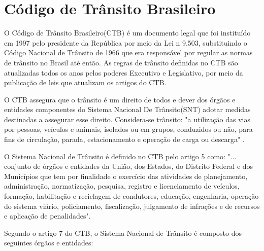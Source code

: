 \section{Código de Trânsito Brasileiro}


    O Código de Trânsito Brasileiro(CTB) é um documento legal que foi instituído em 1997 pelo presidente da República por meio da Lei n 9.503, substituindo o Código Nacional de Trânsito de 1966 que era responsável por regular as normas de trânsito no Brasil até então. As regras de trânsito definidas no CTB são atualizadas todos os anos pelos poderes Executivo e Legislativo, por meio da publicação de leis que atualizam os artigos do CTB.

    O CTB assegura que o trânsito é um direito de todos e dever dos órgãos e entidades componentes do Sistema Nacional De Trânsito(SNT) adotar medidas destinadas a assegurar esse direito. Considera-se trânsito: "a utilização das vias por pessoas, veículos e animais, isolados ou em grupos, conduzidos ou não, para fins de circulação, parada, estacionamento e operação de carga ou descarga" \cite{codigo_transito_bra}.
    
    O Sistema Nacional de Trânsito é definido no CTB pelo artigo 5 como: "{...} conjunto de órgãos e entidades da União, dos Estados, do Distrito Federal e dos Municípios que tem por finalidade o exercício das atividades de planejamento, administração, normatização, pesquisa, registro e licenciamento de veículos, formação, habilitação e reciclagem de condutores, educação, engenharia, operação do sistema viário, policiamento, fiscalização, julgamento de infrações e de recursos e aplicação de penalidades".

    Segundo o artigo 7 do CTB, o Sistema Nacional de Trânsito é composto dos seguintes órgãos e entidades:
    
